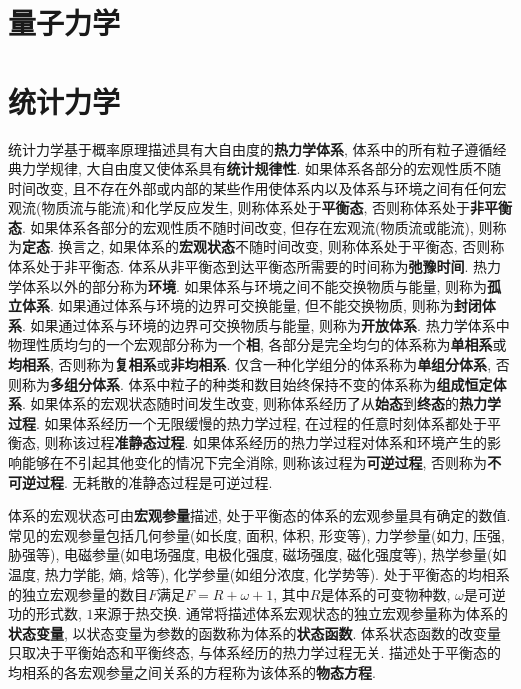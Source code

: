 \section[量子力学]{量子力学}\label{量子力学}


\newpage
\section[统计力学]{统计力学}\label{统计力学}
统计力学基于概率原理描述具有大自由度的\textbf{热力学体系}, 体系中的所有粒子遵循经典力学规律, 大自由度又使体系具有\textbf{统计规律性}. 如果体系各部分的宏观性质不随时间改变, 且不存在外部或内部的某些作用使体系内以及体系与环境之间有任何宏观流(物质流与能流)和化学反应发生, 则称体系处于\textbf{平衡态}, 否则称体系处于\textbf{非平衡态}. 如果体系各部分的宏观性质不随时间改变, 但存在宏观流(物质流或能流), 则称为\textbf{定态}. 换言之, 如果体系的\textbf{宏观状态}不随时间改变, 则称体系处于平衡态, 否则称体系处于非平衡态. 体系从非平衡态到达平衡态所需要的时间称为\textbf{弛豫时间}. 热力学体系以外的部分称为\textbf{环境}. 如果体系与环境之间不能交换物质与能量, 则称为\textbf{孤立体系}. 如果通过体系与环境的边界可交换能量, 但不能交换物质, 则称为\textbf{封闭体系}. 如果通过体系与环境的边界可交换物质与能量, 则称为\textbf{开放体系}. 热力学体系中物理性质均匀的一个宏观部分称为一个\textbf{相}, 各部分是完全均匀的体系称为\textbf{单相系}或\textbf{均相系}, 否则称为\textbf{复相系}或\textbf{非均相系}. 仅含一种化学组分的体系称为\textbf{单组分体系}, 否则称为\textbf{多组分体系}. 体系中粒子的种类和数目始终保持不变的体系称为\textbf{组成恒定体系}. 如果体系的宏观状态随时间发生改变, 则称体系经历了从\textbf{始态}到\textbf{终态}的\textbf{热力学过程}. 如果体系经历一个无限缓慢的热力学过程, 在过程的任意时刻体系都处于平衡态, 则称该过程\textbf{准静态过程}. 如果体系经历的热力学过程对体系和环境产生的影响能够在不引起其他变化的情况下完全消除, 则称该过程为\textbf{可逆过程}, 否则称为\textbf{不可逆过程}. 无耗散的准静态过程是可逆过程.

体系的宏观状态可由\textbf{宏观参量}描述, 处于平衡态的体系的宏观参量具有确定的数值. 常见的宏观参量包括几何参量(如长度, 面积, 体积, 形变等), 力学参量(如力, 压强, 胁强等), 电磁参量(如电场强度, 电极化强度, 磁场强度, 磁化强度等), 热学参量(如温度, 热力学能, 熵, 焓等), 化学参量(如组分浓度, 化学势等). 处于平衡态的均相系的独立宏观参量的数目$ F $满足$ F=R+\omega+1 $, 其中$ R $是体系的可变物种数, $ \omega $是可逆功的形式数, $ 1 $来源于热交换. 通常将描述体系宏观状态的独立宏观参量称为体系的\textbf{状态变量}, 以状态变量为参数的函数称为体系的\textbf{状态函数}. 体系状态函数的改变量只取决于平衡始态和平衡终态, 与体系经历的热力学过程无关. 描述处于平衡态的均相系的各宏观参量之间关系的方程称为该体系的\textbf{物态方程}.

